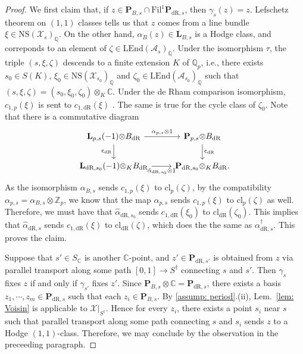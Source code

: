 \documentclass[11pt, letterpaper]{amsart}
\theoremstyle{plain}
\theoremstyle{definition}
\newcommand{\IC}{\mathbb{C}}
\newcommand{\IQ}{\mathbb{Q}}
\newcommand{\IZ}{\mathbb{Z}}
\newcommand\tensor{{\otimes}}
\newcommand{\<}{\langle}
\renewcommand{\>}{\rangle}
\newcommand{\NS}{\mathrm{NS}}
\newcommand{\sA}{\mathcal{A}}
\newcommand{\sX}{\mathcal{X}}
\newcommand{\bL}{\mathbf{L}}
\newcommand{\LEnd}{\mathrm{LEnd}}
\newcommand{\bP}{\mathbf{P}}
\newcommand{\dR}{\mathrm{dR}}
\renewcommand{\sc}{\mathsf{c}}
\newcommand{\Fil}{\mathrm{Fil}}
\begin{document}
\begin{proof}
    We first claim that, if $z \in \bP_{B, s} \cap \Fil^1 \bP_{\dR, s}$, then $\gamma_s(z) = z$. 
    Lefschetz theorem on $(1, 1)$ classes tells us that $z$ comes from a line bundle $\xi \in \NS(\sX_s)_\IQ$.
    On the other hand, $\alpha_B(z) \in \bL_{B, s}$ is a Hodge class, and correponds to an element of $\zeta \in \LEnd(\sA_s)_\IQ$. 
    Under the isomorphism $\tau$, the triple $(s, \xi, \zeta)$ descends to a finite extension $K$ of $\IQ_p$, i.e., there exists $s_0 \in S(K)$, $\xi_0 \in \NS(\sX_{s_0})_\IQ$ and $\zeta_0 \in \LEnd(\sA_{s_0})_\IQ$ such that $(s, \xi, \zeta) = (s_0, \xi_0, \zeta_0) \tensor_K \IC$. 
    Under the de Rham comparison isomorphism, $c_{1, p}(\xi)$ is sent to $c_{1, \dR}(\xi)$ \cite[Prop.~11.2]{IIK}. 
    The same is true for the cycle class of $\zeta_0$. 
    Note that there is a commutative diagram \[\begin{tikzcd}
	{\bL_{p, s}(-1) \tensor B_\dR} & {\bP_{p, s} \tensor B_\dR} \\
	{\bL_{\dR, s_0}(-1) \tensor_K B_\dR} & {\bP_{\dR, s_0} \tensor_K B_\dR}
	\arrow["{\alpha_{p, s} \tensor 1}", from=1-1, to=1-2]
	\arrow["{\sc_\dR}"', from=1-1, to=2-1]
	\arrow["{\hat{\alpha}_{\dR, s_0} \tensor 1}"', from=2-1, to=2-2]
	\arrow["{\sc_\dR}", from=1-2, to=2-2].
    \end{tikzcd}\]
    As the isomorphism $\alpha_{B, s}$ sends $c_{1, p}(\xi)$ to $\mathrm{cl}_{p}(\zeta)$, by the compatibility $\alpha_{p, s} = \alpha_{B, s} \tensor \IZ_p$, we know that the map $\alpha_{p, s}$ sends $c_{1, p}(\xi)$ to $\mathrm{cl}_{p}(\zeta)$ as well.
    Therefore, we must have that $\hat{\alpha}_{\dR, s_0}$ sends $c_{1, \dR}(\xi_0)$ to $\mathrm{cl}_{\dR}(\zeta_0)$. This implies that $\hat{\alpha}_{\dR, s}$ sends $c_{1, \dR}(\xi)$ to $\mathrm{cl}_\dR(\zeta)$, which does the the same as $\alpha^\dagger_{\dR, s}$. This proves the claim. 

    Suppose that $s' \in S_\IC$ is another $\IC$-point, and $z' \in \bP_{\dR, s'}$ is obtained from $z$ via parallel transport along some path $[0, 1] \to S^\dagger$ connecting $s$ and $s'$. 
    Then $\gamma_{s}$ fixes $z$ if and only if $\gamma_{s'}$ fixes $z'$. 
    Since $\bP_{B, s} \tensor \IC = \bP_{\dR, s}$, there exists a basis $z_1, \cdots, z_m \in \bP_{\dR, s}$ such that each $z_i \in \bP_{B, s}$. 
    By \cref{assump: period}.(ii), Lem.~\ref{lem: Voisin} is applicable to $\sX|_{S^\dagger}$.  
    Hence for every $z_i$, there exists a point $s_i$ near $s$ such that parallel transport along some path connecting $s$ and $s_i$ sends $z$ to a Hodge $(1, 1)$-class. Therefore, we may conclude by the observation in the preceeding paragraph.  
\end{proof}
\end{document}
